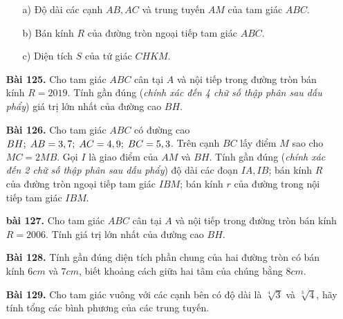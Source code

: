 \documentclass[12pt,a4paper]{article}
\begin{document}
\begin{enumerate}
        \begin{enumerate}
            \item[a)] Độ dài các cạnh $AB,AC$ và trung tuyến $AM$ của tam giác $ABC$.
            \item[b)] Bán kính $R$ của đường tròn ngoại tiếp tam giác $ABC$.
            \item[c)] Diện tích $S$ của tứ giác $CHKM$.
        \end{enumerate}
    \item[\textbf{Bài 125.}] Cho tam giác $ABC$ cân tại $A$ và nội tiếp trong đường tròn bán kính $R = 2019$. Tính gần đúng (\textit{chính xác đến 4 chữ số thập phân sau dấu phẩy}) giá trị lớn nhất của đường cao $BH$.
    \item[\textbf{Bài 126.}] Cho tam giác $ABC$ có đường cao $BH;\thickspace AB = 3,7;\thickspace AC = 4,9;\thickspace BC = 5,3$. Trên cạnh $BC$ lấy điểm $M$ sao cho $MC = 2MB$. Gọi $I$ là giao điểm của $AM$ và $BH$. Tính gần đúng (\textit{chính xác đến 2 chữ số thập phân sau dấu phẩy}) độ dài các đoạn $IA,IB$; bán kính $R$ của đường tròn ngoại tiếp tam giác $IBM$; bán kính $r$ của đường trong nội tiếp tam giác $IBM$.
    \item[\textbf{bài 127.}] Cho tam giác $ABC$ cân tại $A$ và nội tiếp trong đường tròn bán kính $R = 2006$. Tính giá trị lớn nhất của đường cao $BH$.
    \item[\textbf{Bài 128.}] Tính gần đúng diện tích phần chung của hai đường tròn có bán kính $6cm$ và $7cm$, biết khoảng cách giữa hai tâm của chúng bằng $8cm$.
    \item[\textbf{Bài 129.}] Cho tam giác vuông với các cạnh bên có độ dài là $\sqrt[4]{3}$ và $\sqrt[3]{4}$, hãy tính tổng các bình phương của các trung tuyến.
\end{enumerate}
\end{document}
